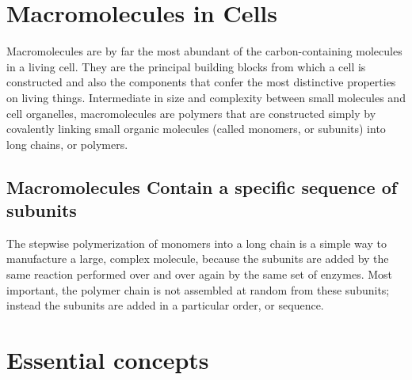 \section{Macromolecules in Cells}

Macromolecules are by far the most abundant
of the carbon-containing molecules in a living cell. They
are the principal building blocks from which a cell is constructed and
also the components that confer the most distinctive properties on living things.
Intermediate in size and complexity between small molecules
and cell organelles, macromolecules are polymers that are constructed
simply by covalently linking small organic molecules (called monomers,
or subunits) into long chains, or polymers.

\subsection{Macromolecules Contain a specific sequence of subunits}

The stepwise polymerization of monomers into a long chain is a simple
way to manufacture a large, complex molecule, because the subunits are
added by the same reaction performed over and over again by the same
set of enzymes. Most important, the polymer chain is
not assembled at random from these subunits; instead the subunits are
added in a particular order, or sequence.

\section{Essential concepts}

